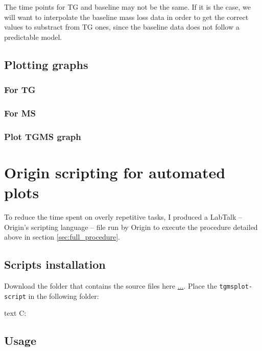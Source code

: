 \documentclass[a4paper, 11pt, raggedright, parskip]{tufte-style-article}
\begin{document}
The time points for TG and baseline may not be the same. If it is the case, we will want to interpolate the baseline mass loss data in order to get the correct values to substract from TG ones, since the baseline data does not follow a predictable model.


\subsection{Plotting graphs}

\subsubsection{For TG}

\subsubsection{For MS}

\subsubsection{Plot TGMS graph}


\section{Origin scripting for automated plots}
\label{sec:origin_scripting}	
	
To reduce the time spent on overly repetitive tasks, I produced a LabTalk -- Origin's scripting language -- file run by Origin to execute the procedure detailed above in section \ref{sec:full_procedure}.


\subsection{Scripts installation}

Download the folder that contains the source files here \url{...}.
Place the \texttt{tgmsplot-script} in the following folder:

%
\begin{codebox}{text}
C:\ProgramFiles{}\
\end{codebox}

\subsection{Usage}
\end{document}
